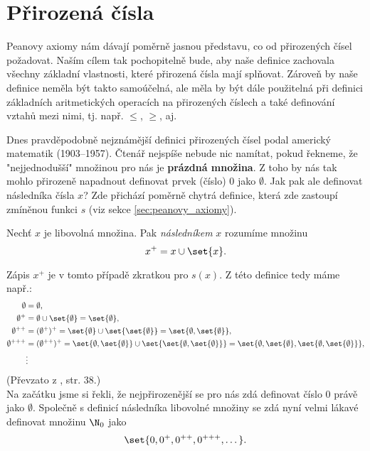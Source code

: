 \section{Přirozená čísla}\label{sec:prizozena_cisla}
Peanovy axiomy nám dávají poměrně jasnou představu, co od přirozených čísel požadovat. Naším cílem tak pochopitelně bude, aby naše definice zachovala všechny základní vlastnosti, které přirozená čísla mají splňovat. Zároveň by naše definice neměla být takto samoúčelná, ale měla by být dále použitelná při definici základních aritmetických operacích na přirozených číslech a také definování vztahů mezi nimi, tj. např. $\leq$, $\geq$, aj.\par
Dnes pravděpodobně nejznámější definici přirozených čísel podal americký matematik  (1903--1957). Čtenář nejspíše nebude nic namítat, pokud řekneme, že "nejjednodušší" množinou pro nás je \textbf{prázdná množina}. Z toho by nás tak mohlo přirozeně napadnout definovat prvek (číslo) 0 jako $\emptyset$. Jak pak ale definovat následníka čísla $x$? Zde přichází poměrně chytrá definice, která zde zastoupí zmíněnou funkci $s$ (viz sekce \ref{sec:peanovy_axiomy}).
\begin{definition}[Následník]
    Nechť $x$ je libovolná množina. Pak \emph{následníkem} $x$ rozumíme množinu
    \begin{equation*}
        x^+=x\cup\set{x}.
    \end{equation*}
\end{definition}
Zápis $x^+$ je v tomto případě zkratkou pro $s(x)$. Z této definice tedy máme např.:
\begin{align*}
    \emptyset&=\emptyset,\\
    \emptyset^+&=\emptyset\cup\set{\emptyset}=\set{\emptyset},\\
    \emptyset^{++}&=(\emptyset^+)^+=\set{\emptyset}\cup\set{\set{\emptyset}}=\set{\emptyset,\set{\emptyset}},\\
    \emptyset^{+++}&=(\emptyset^{++})^+=\set{\emptyset,\set{\emptyset}}\cup\set{\set{\emptyset,\set{\emptyset}}}=\set{\emptyset,\set{\emptyset},\set{\emptyset,\set{\emptyset}}},\\
    &\vdots
\end{align*}
(Převzato z \cite{Goldrei2017}, str. 38.)\\
Na začátku jsme si řekli, že nejpřirozenější se pro nás zdá definovat číslo 0 právě jako $\emptyset$. Společně s definicí následníka libovolné množiny se zdá nyní velmi lákavé definovat množinu $\N_0$ jako
\begin{equation*}
    \set{0,0^+,0^{++},0^{+++},\dots}.
\end{equation*}
